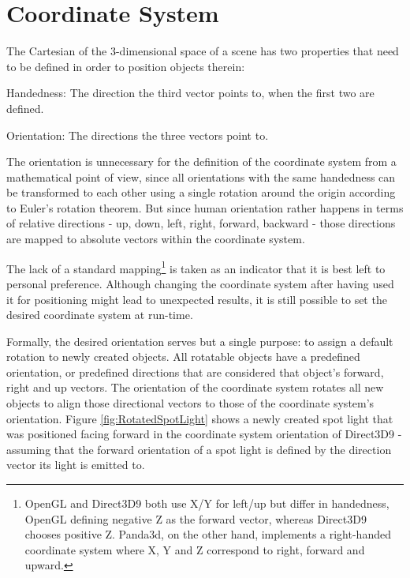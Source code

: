 \section{Coordinate System}
\label{chapter:design:coordinatesystem}

	The Cartesian  of the 3-dimensional space of a scene has two properties that need to be defined in order to position objects therein:

	\begin{smalllist}
		\item Handedness: The direction the third vector points to, when the first two are defined.
		\item Orientation: The directions the three vectors point to.
	\end{smalllist}

	The orientation is unnecessary for the definition of the coordinate system from a mathematical point of view, since all orientations with the same handedness can be transformed to each other using a single rotation around the origin according to Euler's rotation theorem\cite{PP07}. But since human orientation rather happens in terms of relative directions - up, down, left, right, forward, backward - those directions are mapped to absolute vectors within the coordinate system.

	The lack of a standard mapping\footnote{OpenGL and Direct3D9 both use X/Y for left/up but differ in handedness, OpenGL defining negative Z as the forward vector\cite{Buss:2003:CGM:861813}, whereas Direct3D9 chooses positive Z\cite{jones2004beginning}. Panda3d, on the other hand, implements a right-handed coordinate system where X, Y and Z correspond to right, forward and upward\cite{Goslin:2004:PGE:1032275.1032359}.} is taken as an indicator that it is best left to personal preference. Although changing the coordinate system after having used it for positioning might lead to unexpected results, it is still possible to set the desired coordinate system at run-time.

	Formally, the desired orientation serves but a single purpose: to assign a default rotation to newly created objects. All rotatable objects have a predefined orientation, or predefined directions that are considered that object's forward, right and up vectors. The orientation of the coordinate system rotates all new objects to align those directional vectors to those of the coordinate system's orientation. Figure \ref{fig:RotatedSpotLight} shows a newly created spot light that was positioned facing forward in the coordinate system orientation of Direct3D9 - assuming that the forward orientation of a spot light is defined by the direction vector its light is emitted to.

